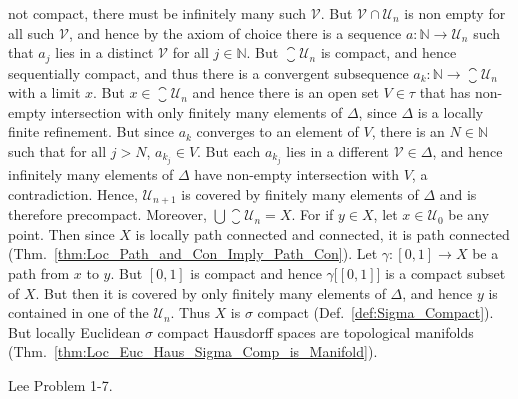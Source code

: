 \documentclass{article}                                                        %
\begin{document}
\begin{solution}
                not compact, there must be infinitely many such $\mathcal{V}$. But
                $\mathcal{V}\cap\mathcal{U}_{n}$ is non
                empty for all such $\mathcal{V}$, and hence by the axiom of choice
                there is a sequence $a:\mathbb{N}\rightarrow\mathcal{U}_{n}$ such
                that $a_{j}$ lies in a distinct $\mathcal{V}$ for all
                $j\in\mathbb{N}$. But $\closure{\mathcal{U}_{n}}$ is compact, and
                hence sequentially compact, and thus there is a convergent
                subsequence $a_{k}:\mathbb{N}\rightarrow\closure{\mathcal{U}_{n}}$
                with a limit $x$. But $x\in\closure{\mathcal{U}_{n}}$ and hence
                there is an open set $V\in\tau$ that has non-empty intersection with
                only finitely many elements of $\Delta$, since $\Delta$ is a locally
                finite refinement. But since $a_{k}$ converges to an element of $V$,
                there is an $N\in\mathbb{N}$ such that for all $j>N$,
                $a_{k_{j}}\in{V}$. But each $a_{k_{j}}$ lies in a different
                $\mathcal{V}\in\Delta$, and hence infinitely many elements of
                $\Delta$ have non-empty intersection with $V$, a contradiction.
                Hence, $\mathcal{U}_{n+1}$ is covered by finitely many elements of
                $\Delta$ and is therefore precompact. Moreover,
                $\bigcup\closure{\mathcal{U}_{n}}=X$. For if $y\in{X}$, let
                $x\in\mathcal{U}_{0}$ be any point. Then since $X$ is locally path
                connected and connected, it is path connected
                (Thm.~\ref{thm:Loc_Path_and_Con_Imply_Path_Con}).
                Let $\gamma:[0,1]\rightarrow{X}$ be a path from $x$ to $y$. But
                $[0,1]$ is compact and hence $\gamma\big[[0,1]\big]$ is a compact
                subset of $X$. But then it is covered by only finitely many elements
                of $\Delta$, and hence $y$ is contained in one of the
                $\mathcal{U}_{n}$. Thus $X$ is $\sigma$ compact
                (Def.~\ref{def:Sigma_Compact}). But locally Euclidean $\sigma$
                compact Hausdorff spaces are topological manifolds
                (Thm.~\ref{thm:Loc_Euc_Haus_Sigma_Comp_is_Manifold}).
            \end{solution}
            \begin{problem}
                Lee Problem 1-7.
            \end{problem}
\end{document}
